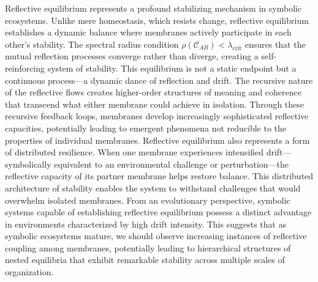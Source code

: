 \begin{scholium}
\label{scholium:bk5__distributed_resilience}
Reflective equilibrium represents a profound stabilizing mechanism in symbolic ecosystems. Unlike mere homeostasis, which resists change, reflective equilibrium establishes a dynamic balance where membranes actively participate in each other's stability. The spectral radius condition $\rho(\mathcal{C}_{AB}) < \lambda_{\text{crit}}$ ensures that the mutual reflection processes converge rather than diverge, creating a self-reinforcing system of stability.
This equilibrium is not a static endpoint but a continuous process—a dynamic dance of reflection and drift. The recursive nature of the reflective flows creates higher-order structures of meaning and coherence that transcend what either membrane could achieve in isolation. Through these recursive feedback loops, membranes develop increasingly sophisticated reflective capacities, potentially leading to emergent phenomena not reducible to the properties of individual membranes.
Reflective equilibrium also represents a form of distributed resilience. When one membrane experiences intensified drift—symbolically equivalent to an environmental challenge or perturbation—the reflective capacity of its partner membrane helps restore balance. This distributed architecture of stability enables the system to withstand challenges that would overwhelm isolated membranes.
From an evolutionary perspective, symbolic systems capable of establishing reflective equilibrium possess a distinct advantage in environments characterized by high drift intensity. This suggests that as symbolic ecosystems mature, we should observe increasing instances of reflective coupling among membranes, potentially leading to hierarchical structures of nested equilibria that exhibit remarkable stability across multiple scales of organization.
\end{scholium}
